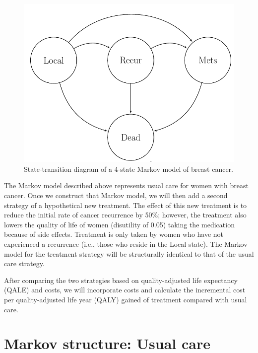 \documentclass[]{article}
\theoremstyle{definition}
\theoremstyle{definition}
\theoremstyle{definition}
\theoremstyle{remark}
\begin{document}
\begin{figure}[H]

{\centering \includegraphics{figs/Markov-Diagram-BRCA} 

}

\caption{State-transition diagram of a 4-state Markov model of breast cancer.}\label{fig:state-transition-diag}
\end{figure}

The Markov model described above represents usual care for women with
breast cancer. Once we construct that Markov model, we will then add a
second strategy of a hypothetical new treatment. The effect of this new
treatment is to reduce the initial rate of cancer recurrence by 50\%;
however, the treatment also lowers the quality of life of women
(disutility of 0.05) taking the medication because of side effects.
Treatment is only taken by women who have not experienced a recurrence
(i.e., those who reside in the Local state). The Markov model for the
treatment strategy will be structurally identical to that of the usual
care strategy.

After comparing the two strategies based on quality-adjusted life
expectancy (QALE) and costs, we will incorporate costs and calculate the
incremental cost per quality-adjusted life year (QALY) gained of
treatment compared with usual care.

\section{Markov structure: Usual
care}\label{markov-structure-usual-care}
\end{document}
